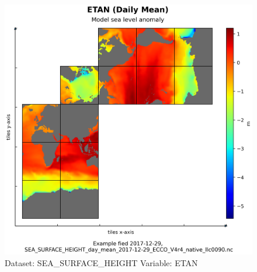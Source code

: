 \begin{figure}[H]
\centering
\includegraphics[width=\textwidth]{../images/plots/native_plots/Sea_Surface_Height/ETAN.png}
\caption{Dataset: SEA\_SURFACE\_HEIGHT Variable: ETAN}
\label{tab:table-SEA_SURFACE_HEIGHT_ETAN-Plot}
\end{figure}
\pagebreak
